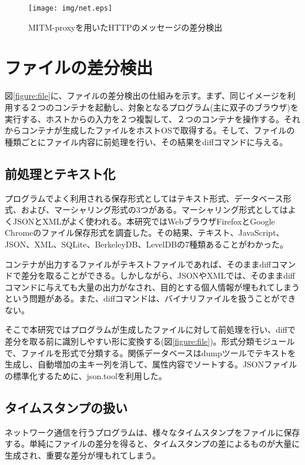 \documentclass[a4paper,twocolumn,10pt]{jarticle}
\begin{document}
\begin{figure*}[ht]
\begin{center}
\texttt{[image: img/net.eps]}
\caption{MITM-proxyを用いたHTTPのメッセージの差分検出}
\label{figure:network}
\end{center}
\end{figure*}


\section{ファイルの差分検出}
\label{cha:file}

図\ref{figure:file}に、ファイルの差分検出の仕組みを示す。まず、同じイメージを利用する２つのコンテナを起動し、対象となるプログラム(主に双子のブラウザ)を実行する、ホストからの入力を２つ複製して、２つのコンテナを操作する。それからコンテナが生成したファイルをホストOSで取得する。そして、ファイルの種類ごとにファイル内容に前処理を行い、その結果をdiffコマンドに与える。

\subsection{前処理とテキスト化}
\label{sec:prep}
プログラムでよく利用される保存形式としてはテキスト形式、データベース形式、および、マーシャリング形式の3つがある。マーシャリング形式としてはよくJSONとXMLがよく使われる。本研究ではWebブラウザFirefoxとGoogle Chromeのファイル保存形式を調査した。その結果、テキスト、JavaScript、JSON、XML、SQLite、BerkeleyDB、LevelDBの7種類あることがわかった。

コンテナが出力するファイルがテキストファイルであれば、そのままdiffコマンドで差分を取ることができる。しかしながら、JSONやXMLでは、そのままdiffコマンドに与えても大量の出力がなされ、目的とする個人情報が埋もれてしまうという問題がある。また、diffコマンドは、バイナリファイルを扱うことができない。

そこで本研究ではプログラムが生成したファイルに対して前処理を行い、diffで差分を取る前に識別しやすい形に変換する(図\ref{figure:file})。形式分類モジュールで、ファイルを形式で分類する。関係データベースはdumpツールでテキストを生成し、自動増加の主キー列を消して、属性内容でソートする。JSONファイルの標準化するために、json.toolを利用した。


\subsection{タイムスタンプの扱い}
\label{cha:timestamp}
ネットワーク通信を行うプログラムは、様々なタイムスタンプをファイルに保存する。単純にファイルの差分を得ると、タイムスタンプの差によるものが大量に生成され、重要な差分が埋もれてしまう。
\end{document}
